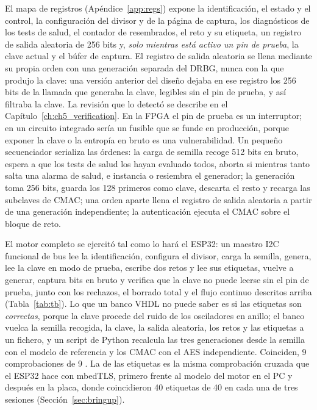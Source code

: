 El mapa de registros (Apéndice~\ref{app:regs}) expone la identificación,
el estado y el control, la configuración del divisor y de la página de
captura, los diagnósticos de los tests de salud, el contador de
resembrados, el reto y su etiqueta, un registro de salida aleatoria
de 256 bits y, \emph{solo mientras está activo un pin de prueba}, la
clave actual y el búfer de captura. El registro de salida aleatoria se
llena mediante su propia orden con una generación separada del DRBG,
nunca con la que produjo la clave: una versión anterior del diseño
dejaba en ese registro los 256 bits de la llamada que generaba la clave,
legibles sin el pin de prueba, y así filtraba la clave. La revisión que
lo detectó se describe en el Capítulo~\ref{ch:ch5_verification}. En la FPGA el pin
de prueba es un interruptor; en un circuito integrado sería un fusible
que se funde en producción, porque exponer la clave o la entropía en
bruto es una vulnerabilidad. Un pequeño secuenciador serializa las
órdenes: la carga de semilla recoge 512 bits en bruto, espera a que los
tests de salud los hayan evaluado todos, aborta si mientras tanto salta
una alarma de salud, e instancia o resiembra el generador; la generación toma 256 bits, guarda los 128 primeros como clave, descarta el resto y recarga las subclaves
de CMAC; una orden aparte llena el registro de salida aleatoria a partir
de una generación independiente; la autenticación ejecuta el CMAC sobre
el bloque de reto.

El motor completo se ejercitó tal como lo hará el ESP32: un maestro
\ac{I2C} funcional de bus lee la identificación, configura el divisor,
carga la semilla, genera, lee la clave en modo de prueba, escribe dos
retos y lee sus etiquetas, vuelve a generar, captura bits en bruto y
verifica que la clave no puede leerse sin el pin de prueba, junto con los
rechazos, el borrado total y el flujo continuo descritos arriba
(Tabla~\ref{tab:tb}). Lo que un banco VHDL no puede saber es si las etiquetas
son \emph{correctas}, porque la clave procede del ruido de los
osciladores en anillo; el banco vuelca la semilla recogida, la clave, la
salida aleatoria, los retos y las etiquetas a un fichero, y un script de
Python recalcula las tres generaciones desde la semilla con el modelo de
referencia y los CMAC con el AES independiente. Coinciden, 9
comprobaciones de 9 \simu{}. La de las etiquetas es la misma
comprobación cruzada que el
ESP32 hace con mbedTLS, primero frente al modelo del motor en el PC y
después en la placa, donde coincidieron 40 etiquetas de 40 en cada una
de tres sesiones \meas{} (Sección~\ref{sec:bringup}).
